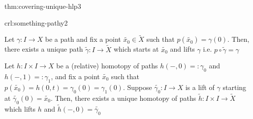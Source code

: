 \documentclass[landscape, 8pt]{extarticle}
\begin{document}
\begin{multicols*}{3}
\vspace{-7pt}
\begin{thm}{thm:covering-unique-hlp}{3}
	\vspace{-2pt}
	{
	}
	
\end{thm}

\vspace{-7pt}
\begin{crl}[]{crl:something-pathy}{2}
	\vspace{-2pt}
	\begin{enumerate-zero}
	    \item Let $\gamma : I \to X$ be a path and fix a point $\tilde{x_{0}}\in \tilde{X}$ such that $p(\tilde{x_{0}}) = \gamma(0)$. Then, there exists a unique path $\tilde{\gamma} : I \to \tilde{X}$ which starts at $\tilde{x_{0}}$ and lifts $\gamma$ i.e. $p \circ \tilde{\gamma} = \gamma$
	    \item Let $h : I \times I \to X$ be a (relative) homotopy of paths $h(-, 0) =: \gamma_{0}$ and $h(-, 1) =: \gamma_{1}$, and fix a point $\tilde{x_{0}}$ such that $p(\tilde{x_{0}}) = h(0, t) = \gamma_{0}(0) = \gamma_{1}(0)$. Suppose $\tilde{\gamma_{0}} : I \to X$ is a lift of $\gamma$ starting at $\tilde{\gamma_{0}}(0) = \tilde{x_{0}}$. Then, there exists a unique homotopy of paths $\tilde{h} : I \times I \to \tilde{X}$ which lifts $h$ and $\tilde{h}(-, 0) = \tilde{\gamma_{0}}$
	\end{enumerate-zero}
\end{crl}


\end{multicols*}
\end{document}
